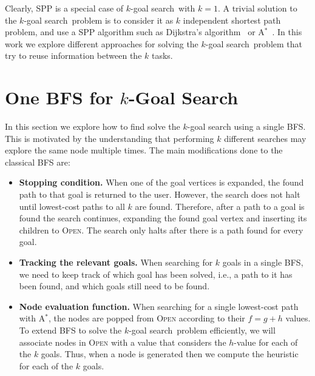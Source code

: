 \documentclass{aicom2e}
\newcommand{\kgs}{$k$-goal search}
\newcommand{\astar}{A$^*$}
\newcommand{\open}{\textsc{Open}}
\begin{document}
Clearly, SPP is a special case of \kgs\ with $k=1$. A trivial solution to the \kgs\ problem is to consider it as $k$ independent shortest path problem, and use a SPP algorithm such as Dijkstra's algorithm~\cite{} or \astar{}~\cite{}. 
In this work we explore different approaches for solving the \kgs\ problem that try to reuse information between the $k$ tasks. 


\section{One BFS for $k$-Goal Search}

In this section we explore how to find solve the \kgs{} using a single BFS. This is motivated by the understanding that performing $k$ different searches may explore the same node multiple times. The main modifications done to the classical BFS are:
\begin{itemize}
    \item {\bf Stopping condition.} When one of the goal vertices is expanded, the found path to that goal is returned to the user. However, the search does not halt until lowest-cost paths to all $k$ are found. Therefore, after a path to a goal is found the search continues, expanding the found goal vertex and inserting its children to \open . The search only halts after there is a path found for every goal. 
    \item {\bf Tracking the relevant goals.} When searching for $k$ goals in a single BFS, we need to keep track of which goal has been solved, 
    i.e., a path to it has been found, and which goals still need to be found. 
    \item {\bf Node evaluation function.} When searching for a single lowest-cost path with \astar{}, the nodes are popped from \open{} 
    according to their $f=g+h$ values. To extend BFS to solve the \kgs\ problem efficiently, 
    we will associate nodes in \open{} with a value that considers the $h$-value for each of the $k$ goals. 
    Thus, when a node is generated then we compute the heuristic for each of the $k$ goals.
\end{itemize}
\end{document}
